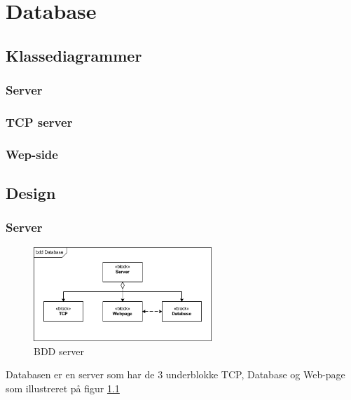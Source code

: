 \chapter{Database}
\section{Klassediagrammer}
\subsection{Server}

\subsection{TCP server}

\subsection{Wep-side}
\section{Design}
\subsection{Server}
\begin{figure}[htbp]
	\centering
	\includegraphics[width=0.6\textwidth]{billeder/bdd_server}
	\caption{BDD server}
	\label{fig:bdd_server}
\end{figure}

Databasen er en server som har de 3 underblokke TCP, Database og Web-page som illustreret på figur \ref{fig:bdd_server}

